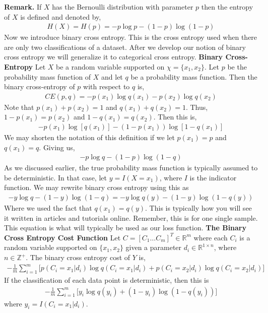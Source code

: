 \documentclass[12pt]{article}
\theoremstyle{definition}
\numberwithin{equation}{section}
\newcommand{\R}{\ensuremath{\mathbb{R}}}
\begin{document}
\textbf{Remark.} If $X$ has the Bernoulli distribution with parameter $p$ then the entropy of $X$ is defined and denoted by,
\begin{gather*}
    H(X) = H(p) = -p\log p - (1-p)\log (1-p)
\end{gather*}
Now we introduce binary cross entropy. This is the cross entropy used when there are only two classifications of a dataset. After we develop our notion of binary cross entropy we will generalize it to categorical cross entropy.
 \textbf{Binary Cross-Entropy} Let $X$ be a random variable supported on $\chi = \{x_1, x_2\}$. Let $p$ be the probability mass function of $X$ and let $q$ be a probability mass function. Then the binary cross-entropy of $p$ with respect to $q$ is,
\begin{gather*}
    CE(p, q) = -p(x_1)\log q(x_1) - p(x_2)\log q(x_2)
\end{gather*}
Note that $p(x_1) + p(x_2) = 1$ and $q(x_1) + q(x_2) = 1$. Thus, $1 - p(x_1) = p(x_2)$ and $1 - q(x_1) = q(x_2)$. Then this is,
\begin{gather*}
    -p(x_1)\log [q(x_1)] - (1 - p(x_1))\log[ 1 - q(x_1)]
\end{gather*}
We may shorten the notation of this definition if we let $p(x_1) = p$ and $q(x_1) = q$. Giving us,
\begin{gather*}
    -p\log q - (1 - p)\log (1 - q)
\end{gather*}
As we discussed earlier, the true probability mass function is typically assumed to be deterministic. In that case, let $y = I(X = x_1)$, where $I$ is the indicator function. We may rewrite binary cross entropy using this as
\begin{gather*}
    -y\log q - (1 - y)\log (1 - q) = -y\log q(y) - (1-y)\log(1 - q(y))
\end{gather*}
Where we used the fact that $q(x_1) = q(y)$. This is typically how you will see it written in articles and tutorials online. Remember, this is for one single sample. This equation is what will typically be used as our loss function.
 \textbf{The Binary Cross Entropy Cost Function} Let $C = [C_1\ldots C_m]^T\in \R^{m}$ where each $C_i$ is a random variable supported on $\{x_1, x_2\}$ given a parameter $d_i\in \R^{1\times n}$, where $n\in \mathbb{Z^+}$. The binary cross entropy cost of $Y$ is,
\begin{gather*}
    -\frac{1}{m}\sum_{i=1}^m \Big[p(C_i = x_1|d_i)\log q(C_i = x_1|d_i) + p(C_i = x_2|d_i)\log q(C_i = x_2|d_i)\Big]
\end{gather*}
If the classification of each data point is deterministic, then this is
\begin{gather*}
    -\frac{1}{m}\sum_{i=1}^m \Big[ y_i\log q(y_i) + (1 - y_i)\log (1 - q(y_i))  \Big]
\end{gather*}
where $y_i = I(C_i = x_1|d_i)$.
\end{document}
